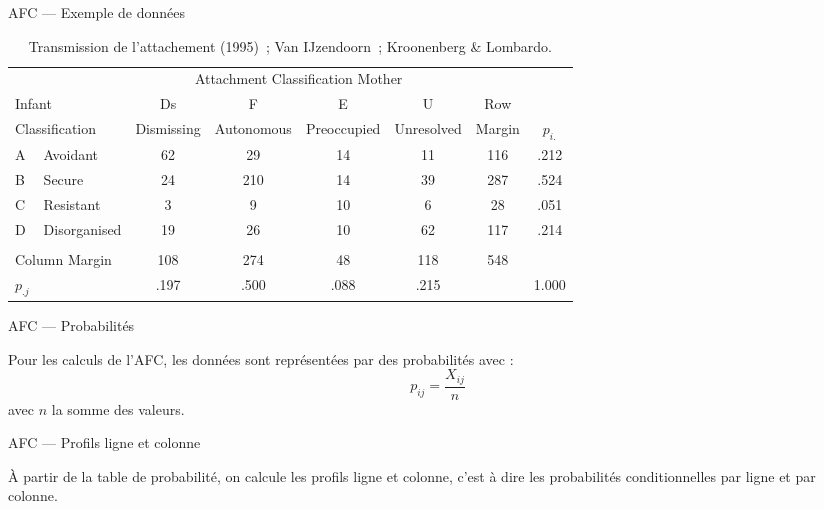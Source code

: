 \begin{frame}{AFC --- Exemple de données}
  \begin{scriptsize}
    \begin{table}
      \begin{tabular}{llcccccc}
        \toprule
        &&\multicolumn{4}{c}{Attachment Classification Mother}\\
        \cline{3-7}
        \multicolumn{2}{l}{Infant} & Ds & F & E & U &Row&\\
        \multicolumn{2}{l}{Classification} & Dismissing & Autonomous & Preoccupied & Unresolved & Margin &$p_{i.}$\\
        \midrule
        A & Avoidant     & 62 &  29 & 14 & 11 & 116& .212\\
        B & Secure       & 24 & 210 & 14 & 39 & 287& .524\\
        C & Resistant    &  3 &   9 & 10 &  6 &  28& .051\\
        D & Disorganised & 19 &  26 & 10 & 62 & 117& .214\\
        &&&&&&&\\
        \multicolumn{2}{l}{Column Margin} & 108 & 274 & 48 & 118 & 548 &\\
        \midrule
        $p_{.j}$& & .197 & .500 & .088 & .215 & & 1.000\\
        \bottomrule
      \end{tabular}
      \caption{Transmission de l'attachement (1995)~; Van  IJzendoorn~; Kroonenberg \& Lombardo.}
    \end{table}
  \end{scriptsize}
\end{frame}

\begin{frame}{AFC --- Probabilités}
  \begin{minipage}{0.45\linewidth}
  \end{minipage}
  \hfill
  \begin{minipage}{0.49\linewidth}
    Pour les calculs de l'AFC, les données sont représentées par des probabilités avec :
    \begin{equation*}
      p_{ij}=\frac{X_{ij}}{n} 
    \end{equation*}
    avec $n$ la somme des valeurs.
  \end{minipage}
\end{frame}

\begin{frame}{AFC --- Profils ligne et colonne}
  \begin{minipage}{0.45\linewidth}
  \end{minipage}
  \hfill
  \begin{minipage}{0.45\linewidth}
  \end{minipage}

  À partir de la table de probabilité, on calcule les profils ligne et colonne, c'est à dire les probabilités conditionnelles par ligne et par colonne.
\end{frame}

